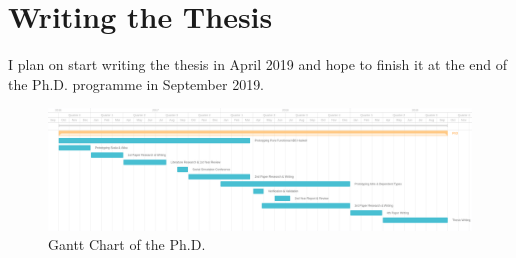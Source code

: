 \section{Writing the Thesis}
I plan on start writing the thesis in April 2019 and hope to finish it at the end of the Ph.D. programme in September 2019.

\clearpage

\begin{landscape}
	\label{fig:gantt}
	\centering
	
	\begin{figure}
	\centering
	\includegraphics[width=1.5\textwidth, height=0.8\textwidth, angle=0]{./fig/phd_gantt.png}
	\caption{Gantt Chart of the Ph.D.}
	\label{fig:gantt}
\end{figure}
\end{landscape}